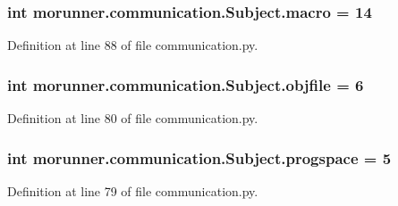 \subsubsection[{macro}]{\setlength{\rightskip}{0pt plus 5cm}int morunner.\+communication.\+Subject.\+macro = 14\hspace{0.3cm}{\ttfamily [static]}}\label{classmorunner_1_1communication_1_1Subject_a632bc45f41b3da11876076c3ec353e21}


Definition at line 88 of file communication.\+py.

\hypertarget{classmorunner_1_1communication_1_1Subject_ad1990b04607b95087b9fbd3838f61db6}{}
\subsubsection[{objfile}]{\setlength{\rightskip}{0pt plus 5cm}int morunner.\+communication.\+Subject.\+objfile = 6\hspace{0.3cm}{\ttfamily [static]}}\label{classmorunner_1_1communication_1_1Subject_ad1990b04607b95087b9fbd3838f61db6}


Definition at line 80 of file communication.\+py.

\hypertarget{classmorunner_1_1communication_1_1Subject_ab8f9822ebaf741ec0a2c549dd05c32b6}{}
\subsubsection[{progspace}]{\setlength{\rightskip}{0pt plus 5cm}int morunner.\+communication.\+Subject.\+progspace = 5\hspace{0.3cm}{\ttfamily [static]}}\label{classmorunner_1_1communication_1_1Subject_ab8f9822ebaf741ec0a2c549dd05c32b6}


Definition at line 79 of file communication.\+py.

\hypertarget{classmorunner_1_1communication_1_1Subject_a47691d34d36ac6b6009eebeb30a137f7}{}
